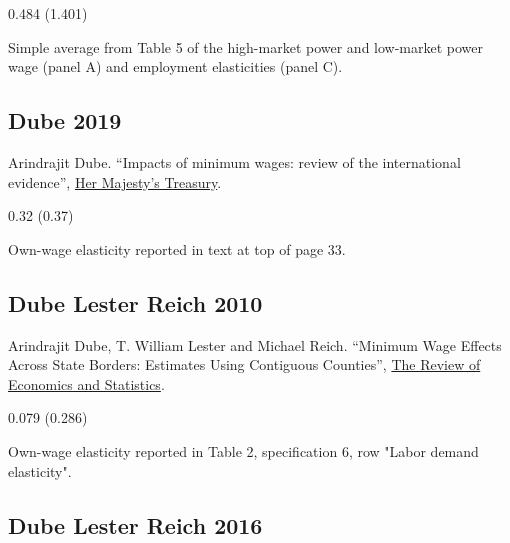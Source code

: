 \vspace{0.7em}

 0.484 (1.401)

\vspace{0.7em}

 Simple average from Table 5 of the high-market power and low-market power wage (panel A) and employment elasticities (panel C).

\subsection*{Dube 2019}
\vspace{-0.7em}

\noindent Arindrajit Dube. ``Impacts of minimum wages: review of the international evidence'', \href{https://assets.publishing.service.gov.uk/government/uploads/system/uploads/attachment_data/file/844350/impacts_of_minimum_wages_review_of_the_international_evidence_Arindrajit_Dube_web.pdf}{Her Majesty's Treasury}.

\vspace{0.7em}

 0.32 (0.37)

\vspace{0.7em}

 Own-wage elasticity reported in text at top of page 33.

\subsection*{Dube Lester Reich 2010}
\vspace{-0.7em}

\noindent Arindrajit Dube, T. William Lester and Michael Reich. ``Minimum Wage Effects Across State Borders: Estimates Using Contiguous Counties'', \href{https://doi.org/10.1162/REST_a_00039}{The Review of Economics and Statistics}.

\vspace{0.7em}

 0.079 (0.286)

\vspace{0.7em}

 Own-wage elasticity reported in Table 2, specification 6, row "Labor demand elasticity".

\subsection*{Dube Lester Reich 2016}
\vspace{-0.7em}

